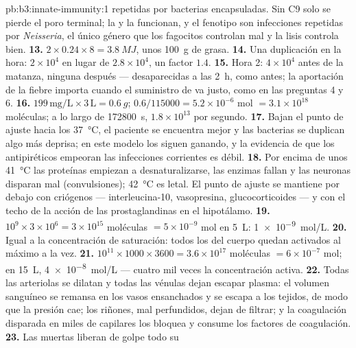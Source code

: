 \begin{solution}{pb:b3:innate-immunity:1}
repetidas por bacterias encapsuladas. Sin C9 solo se pierde el poro
terminal; la  y la  funcionan, y el fenotipo son
infecciones repetidas por \emph{Neisseria}, el único género que los
fagocitos controlan mal y la lisis controla bien.
\textbf{13.} $2\times 0.24\times 8 = \qty{3.8}{MJ}$, unos \qty{100}{g} de
grasa.
\textbf{14.} Una duplicación en la hora: $2\times 10^{4}$ en lugar de
$2.8\times 10^{4}$, un factor $1.4$.
\textbf{15.} Hora 2: $4\times 10^{4}$ antes de la matanza, ninguna
después --- desaparecidas a las \qty{2}{h}, como antes; la aportación de
la fiebre importa cuando el suministro de  va justo, como en
las preguntas 4 y 6.
\textbf{16.} $199\,\text{mg/L}\times 3\,\text{L} = \qty{0.6}{g}$; $0.6/
\num{115000} = 5.2\times 10^{-6}$ mol $= 3.1\times 10^{18}$ moléculas;
a lo largo de \qty{172800}{s}, $1.8\times 10^{13}$ por segundo.
\textbf{17.} Bajan el punto de ajuste hacia los \qty{37}{\celsius}, el
paciente se encuentra mejor y las bacterias se duplican algo más deprisa;
en este modelo los  siguen ganando, y la evidencia de que los
antipiréticos empeoran las infecciones corrientes es débil.
\textbf{18.} Por encima de unos \qty{41}{\celsius} las proteínas empiezan
a desnaturalizarse, las enzimas fallan y las neuronas disparan mal
(convulsiones); \qty{42}{\celsius} es letal. El punto de ajuste se
mantiene por debajo con criógenos --- interleucina-10, vasopresina,
glucocorticoides --- y con el techo de la acción de las prostaglandinas
en el hipotálamo.
\textbf{19.} $10^{9}\times 3\times 10^{6} = 3\times 10^{15}$ moléculas
$= 5\times 10^{-9}$ mol en \qty{5}{L}: \qty{1e-9}{mol/L}.
\textbf{20.} Igual a la concentración de saturación: todos los 
del cuerpo quedan activados al máximo a la vez.
\textbf{21.} $10^{11}\times 1000\times 3600 = 3.6\times 10^{17}$
moléculas $= 6\times 10^{-7}$ mol; en \qty{15}{L}, \qty{4e-8}{mol/L} ---
cuatro mil veces la concentración activa.
\textbf{22.} Todas las arteriolas se dilatan y todas las vénulas dejan
escapar plasma: el volumen sanguíneo se remansa en los vasos ensanchados
y se escapa a los tejidos, de modo que la presión cae; los riñones,
mal perfundidos, dejan de filtrar; y la coagulación disparada en miles de
capilares los bloquea y consume los factores de coagulación.
\textbf{23.} Las  muertas liberan de golpe todo su

\end{solution}
